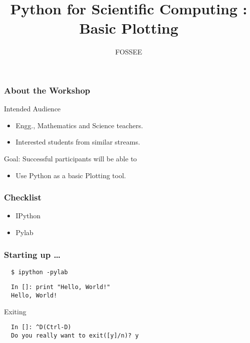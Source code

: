 \documentclass[14pt,compress]{beamer}
\title[Basic Plotting]{Python for Scientific Computing : Basic Plotting}
\author[FOSSEE] {FOSSEE}
\institute[IIT Bombay] {Department of Aerospace Engineering\\IIT Bombay}
\date{}
\begin{document}
\begin{frame}
  \maketitle
\end{frame}

\begin{frame}
  \frametitle{About the Workshop}
  \begin{block}{Intended Audience}
  \begin{itemize}
       \item Engg., Mathematics and Science teachers.
       \item Interested students from similar streams.
  \end{itemize}
  \end{block}  

  \begin{block}{Goal: Successful participants will be able to}
    \begin{itemize}
      \item Use Python as a basic Plotting tool.
    \end{itemize}
  \end{block}
\end{frame}

\begin{frame}
\frametitle{Checklist}
   \begin{itemize}
    \item IPython
    \item Pylab
  \end{itemize}
\end{frame}

\begin{frame}[fragile]
\frametitle{Starting up \ldots}
\begin{block}{}
\begin{verbatim}
  $ ipython -pylab  
\end{verbatim}
\end{block}
\begin{lstlisting}     
  In []: print "Hello, World!"
  Hello, World!
\end{lstlisting}
Exiting
\begin{lstlisting}     
  In []: ^D(Ctrl-D)
  Do you really want to exit([y]/n)? y
\end{lstlisting}
\end{frame}
\end{document}
